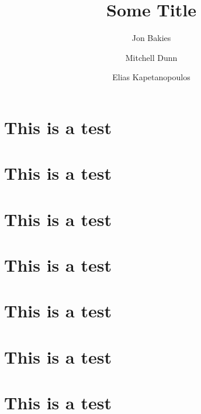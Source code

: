 \documentclass[12pt]{IEEEtran}
\begin{document}
\title{Some Title}
\author{Jon Bakies \and Mitchell Dunn \and Elias Kapetanopoulos} 

\maketitle
\newpage
\clearpage

\section{This is a test}
\blindtext
\section{This is a test}
\blindtext
\section{This is a test}
\blindtext
\section{This is a test}
\blindtext
\section{This is a test}
\blindtext
\section{This is a test}
\blindtext
\section{This is a test}
\blindtext

\end{document}
